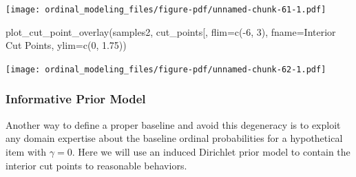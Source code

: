 \documentclass[
  letterpaper,
  DIV=11,
  numbers=noendperiod]{scrartcl}
\newenvironment{Shaded}{\begin{snugshade}}{\end{snugshade}}
\newcommand{\AttributeTok}[1]{\textcolor[rgb]{0.40,0.45,0.13}{#1}}
\newcommand{\ControlFlowTok}[1]{\textcolor[rgb]{0.00,0.23,0.31}{#1}}
\newcommand{\DecValTok}[1]{\textcolor[rgb]{0.68,0.00,0.00}{#1}}
\newcommand{\FloatTok}[1]{\textcolor[rgb]{0.68,0.00,0.00}{#1}}
\newcommand{\FunctionTok}[1]{\textcolor[rgb]{0.28,0.35,0.67}{#1}}
\newcommand{\NormalTok}[1]{\textcolor[rgb]{0.00,0.23,0.31}{#1}}
\newcommand{\OtherTok}[1]{\textcolor[rgb]{0.00,0.23,0.31}{#1}}
\newcommand{\SpecialCharTok}[1]{\textcolor[rgb]{0.37,0.37,0.37}{#1}}
\newcommand{\StringTok}[1]{\textcolor[rgb]{0.13,0.47,0.30}{#1}}
\begin{document}
\begin{Shaded}
\end{Shaded}

\texttt{[image: ordinal\_modeling\_files/figure-pdf/unnamed-chunk-61-1.pdf]}

\begin{Shaded}
\begin{Highlighting}[]
\FunctionTok{plot\_cut\_point\_overlay}\NormalTok{(samples2, }\StringTok{\textquotesingle{}cut\_points[\textquotesingle{}}\NormalTok{,}
                       \AttributeTok{flim=}\FunctionTok{c}\NormalTok{(}\SpecialCharTok{{-}}\DecValTok{6}\NormalTok{, }\DecValTok{3}\NormalTok{), }\AttributeTok{fname=}\StringTok{\textquotesingle{}Interior Cut Points\textquotesingle{}}\NormalTok{,}
                       \AttributeTok{ylim=}\FunctionTok{c}\NormalTok{(}\DecValTok{0}\NormalTok{, }\FloatTok{1.75}\NormalTok{))}
\end{Highlighting}
\end{Shaded}

\texttt{[image: ordinal\_modeling\_files/figure-pdf/unnamed-chunk-62-1.pdf]}

\subsubsection{Informative Prior Model}\label{informative-prior-model}

Another way to define a proper baseline and avoid this degeneracy is to
exploit any domain expertise about the baseline ordinal probabilities
for a hypothetical item with \(\gamma = 0\). Here we will use an induced
Dirichlet prior model to contain the interior cut points to reasonable
behaviors.
\end{document}
